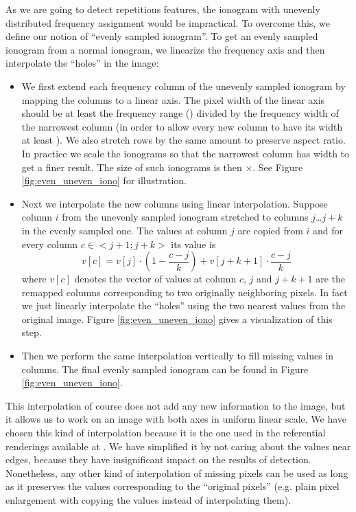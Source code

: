 As we are going to detect repetitious features, the ionogram with unevenly distributed frequency assignment would be impractical. To overcome this, we define our notion of ``evenly sampled ionogram''. To get an evenly sampled ionogram from a normal ionogram, we linearize the frequency axis and then interpolate the ``holes'' in the image:

\begin{itemize}
  \item We first extend each frequency column of the unevenly sampled ionogram by mapping the columns to a linear axis. The pixel width of the linear axis should be at least the frequency range () divided by the frequency width of the narrowest column (in order to allow every new column to have its width at least ). We also stretch rows by the same amount to preserve aspect ratio. In practice we scale the ionograms so that the narrowest column has width  to get a finer result. The size of such ionograms is then $\times$. See Figure \ref{fig:even_uneven_iono} for illustration.
  \item Next we interpolate the new columns using linear interpolation. Suppose column $i$ from the unevenly sampled ionogram stretched to columns $j$\ldots$j+k$ in the evenly sampled one. The values at column $j$ are copied from $i$ and for every column $c\in<j+1; j+k>$ its value is $$v[c] = v[j]\cdot(1-\frac{c-j}{k}) + v[j+k+1]\cdot\frac{c-j}{k}$$ where $v[c]$ denotes the vector of values at column $c$, $j$ and $j+k+1$ are the remapped columns corresponding to two originally neighboring pixels. In fact we just linearly interpolate the ``holes'' using the two nearest values from the original image. Figure \ref{fig:even_uneven_iono} gives a visualization of this step. 
  \item Then we perform the same interpolation vertically to fill missing values in columns. The final evenly sampled ionogram can be found in Figure \ref{fig:even_uneven_iono}.
\end{itemize}

This interpolation of course does not add any new information to the image, but it allows us to work on an image with both axes in uniform linear scale. We have chosen this kind of interpolation because it is the one used in the referential renderings available at \citep{FTP}. We have simplified it by not caring about the values near edges, because they have insignificant impact on the results of detection. Nonetheless, any other kind of interpolation of missing pixels can be used as long as it preserves the values corresponding to the ``original pixels'' (e.g. plain pixel enlargement with copying the values instead of interpolating them).

